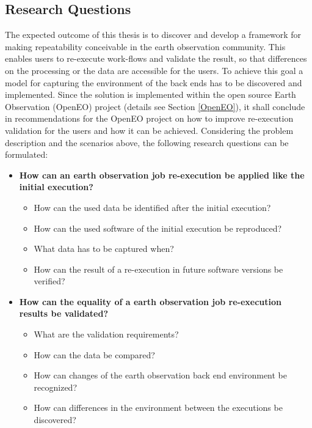 \documentclass[draft,final]{vutinfth} %
\begin{document}
\subsection{Research Questions}\label{research question}

The expected outcome of this thesis is to discover and develop a framework for making repeatability conceivable in the earth observation community. This enables users to re-execute work-flows and validate the result, so that differences on the processing or the data are accessible for the users. To achieve this goal a model for capturing the environment of the back ends has to be discovered and implemented. Since the solution is implemented within the open source Earth Observation (OpenEO) project (details see Section \ref{OpenEO}), it shall conclude in recommendations for the OpenEO project on how to improve re-execution validation for the users and how it can be achieved. Considering the problem description and the scenarios above, the following research questions can be formulated:

\begin{itemize}
	\item \textbf{How can an earth observation job re-execution be applied like the initial execution?}
	\begin{itemize}
		\item How can the used data be identified after the initial execution?
		\item How can the used software of the initial execution be reproduced?
		\item What data has to be captured when?
		\item How can the result of a re-execution in future software versions be verified?
	\end{itemize}
	\item \textbf{How can the equality of a earth observation job re-execution results be validated?}
	\begin{itemize}
		\item What are the validation requirements?
		\item How can the data be compared?
		\item How can changes of the earth observation back end environment be recognized?
		\item How can differences in the environment between the executions be discovered?
	\end{itemize}
\end{itemize}
\end{document}
